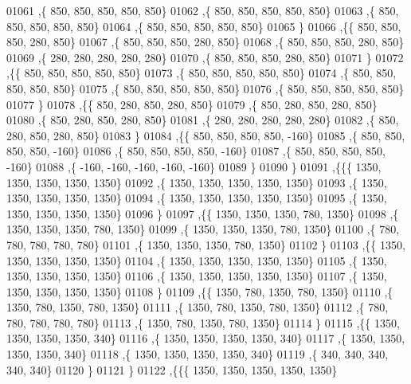 \begin{DoxyCode}
01061    ,\{   850,   850,   850,   850,   850\}
01062    ,\{   850,   850,   850,   850,   850\}
01063    ,\{   850,   850,   850,   850,   850\}
01064    ,\{   850,   850,   850,   850,   850\}
01065    \}
01066   ,\{\{   850,   850,   850,   280,   850\}
01067    ,\{   850,   850,   850,   280,   850\}
01068    ,\{   850,   850,   850,   280,   850\}
01069    ,\{   280,   280,   280,   280,   280\}
01070    ,\{   850,   850,   850,   280,   850\}
01071    \}
01072   ,\{\{   850,   850,   850,   850,   850\}
01073    ,\{   850,   850,   850,   850,   850\}
01074    ,\{   850,   850,   850,   850,   850\}
01075    ,\{   850,   850,   850,   850,   850\}
01076    ,\{   850,   850,   850,   850,   850\}
01077    \}
01078   ,\{\{   850,   280,   850,   280,   850\}
01079    ,\{   850,   280,   850,   280,   850\}
01080    ,\{   850,   280,   850,   280,   850\}
01081    ,\{   280,   280,   280,   280,   280\}
01082    ,\{   850,   280,   850,   280,   850\}
01083    \}
01084   ,\{\{   850,   850,   850,   850,  -160\}
01085    ,\{   850,   850,   850,   850,  -160\}
01086    ,\{   850,   850,   850,   850,  -160\}
01087    ,\{   850,   850,   850,   850,  -160\}
01088    ,\{  -160,  -160,  -160,  -160,  -160\}
01089    \}
01090   \}
01091  ,\{\{\{  1350,  1350,  1350,  1350,  1350\}
01092    ,\{  1350,  1350,  1350,  1350,  1350\}
01093    ,\{  1350,  1350,  1350,  1350,  1350\}
01094    ,\{  1350,  1350,  1350,  1350,  1350\}
01095    ,\{  1350,  1350,  1350,  1350,  1350\}
01096    \}
01097   ,\{\{  1350,  1350,  1350,   780,  1350\}
01098    ,\{  1350,  1350,  1350,   780,  1350\}
01099    ,\{  1350,  1350,  1350,   780,  1350\}
01100    ,\{   780,   780,   780,   780,   780\}
01101    ,\{  1350,  1350,  1350,   780,  1350\}
01102    \}
01103   ,\{\{  1350,  1350,  1350,  1350,  1350\}
01104    ,\{  1350,  1350,  1350,  1350,  1350\}
01105    ,\{  1350,  1350,  1350,  1350,  1350\}
01106    ,\{  1350,  1350,  1350,  1350,  1350\}
01107    ,\{  1350,  1350,  1350,  1350,  1350\}
01108    \}
01109   ,\{\{  1350,   780,  1350,   780,  1350\}
01110    ,\{  1350,   780,  1350,   780,  1350\}
01111    ,\{  1350,   780,  1350,   780,  1350\}
01112    ,\{   780,   780,   780,   780,   780\}
01113    ,\{  1350,   780,  1350,   780,  1350\}
01114    \}
01115   ,\{\{  1350,  1350,  1350,  1350,   340\}
01116    ,\{  1350,  1350,  1350,  1350,   340\}
01117    ,\{  1350,  1350,  1350,  1350,   340\}
01118    ,\{  1350,  1350,  1350,  1350,   340\}
01119    ,\{   340,   340,   340,   340,   340\}
01120    \}
01121   \}
01122  ,\{\{\{  1350,  1350,  1350,  1350,  1350\}

\end{DoxyCode}
